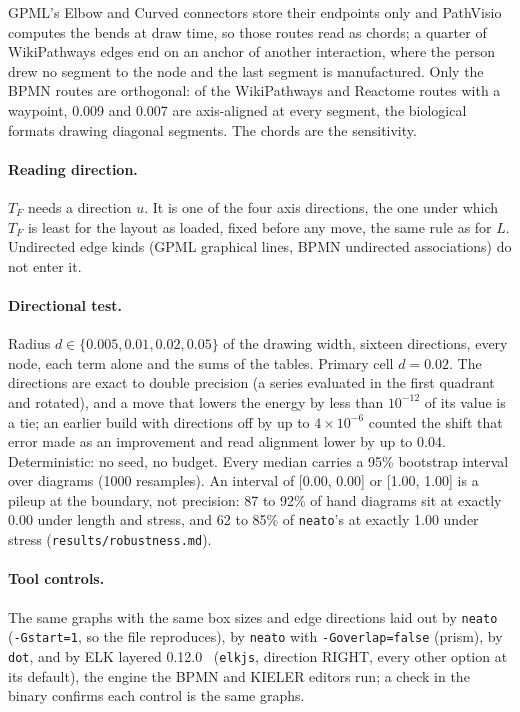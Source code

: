 \documentclass[11pt]{article}
\begin{document}
GPML's Elbow and Curved connectors store
their endpoints only and PathVisio computes the bends at draw time, so those routes read as
chords; a quarter of WikiPathways edges end on an anchor of another interaction, where the
person drew no segment to the node and the last segment is manufactured. Only the BPMN
routes are orthogonal: of the WikiPathways and Reactome routes with a waypoint, 0.009 and
0.007 are axis-aligned at every segment, the biological formats drawing diagonal segments.
The chords are the sensitivity.

\paragraph{Reading direction.} $T_F$ needs a direction $u$. It is one of the four axis directions, the one under which $T_F$ is least for the layout as loaded, fixed before any move, the same rule as for $L$. Undirected edge kinds (GPML graphical lines, BPMN undirected associations) do not enter it.

\paragraph{Directional test.} Radius $d \in \{0.005, 0.01, 0.02, 0.05\}$ of the drawing
width, sixteen directions, every node, each term alone and the sums of the tables. Primary cell $d = 0.02$. The directions are exact to double precision (a series evaluated in the first quadrant and rotated), and a move that lowers the energy by less than $10^{-12}$ of its value is a tie; an earlier build with directions off by up to $4 \times 10^{-6}$ counted the shift that error made as an improvement and read alignment lower by up to 0.04. Deterministic: no seed, no budget. Every median carries a 95\% bootstrap interval over diagrams (1000 resamples). An interval of [0.00, 0.00] or [1.00, 1.00] is a pileup at the boundary, not precision: 87 to 92\% of hand diagrams sit at exactly 0.00 under length and stress, and 62 to 85\% of \texttt{neato}'s at exactly 1.00 under stress (\texttt{results/robustness.md}).

\paragraph{Tool controls.} The same graphs with the same box sizes and edge directions laid out by \texttt{neato} (\texttt{-Gstart=1}, so the file reproduces), by \texttt{neato} with \texttt{-Goverlap=false} (prism), by \texttt{dot}, and by ELK layered 0.12.0~\cite{schulze14} (\texttt{elkjs}, direction RIGHT, every other option at its default), the engine the BPMN and KIELER editors run; a check in the binary confirms each control is the same graphs.
\end{document}
